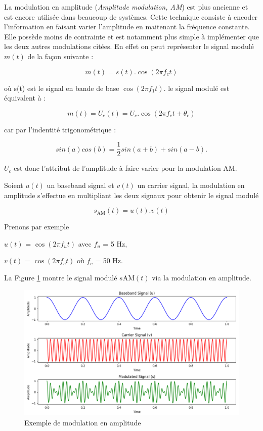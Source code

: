 La modulation en amplitude (\textit{Amplitude modulation, AM}) est plus ancienne et est encore utilisée dans beaucoup de systèmes. Cette technique consiste à encoder l'information en faisant varier l'amplitude en maitenant la fréquence constante. Elle possède moins de contrainte et est notamment plus simple à implémenter que les deux autres modulations citées. En effet on peut représenter le signal modulé $m(t)$ de la façon suivante :

\begin{equation}\label{eq112}
m(t) = s(t) . \cos(2 \pi f_c t)
\end{equation}

où s(t) est le signal en bande de base $\cos(2 \pi f_1 t)$. le signal modulé est équivalent à :

\begin{equation}\label{eq113}
m(t) = U_c(t) = U_c . \cos(2 \pi f_c t + \theta_c)
\end{equation}

car par l'indentité trigonométrique :

\begin{equation}\label{eq114}
sin(a)cos(b) = \frac{1}{2} sin(a+b) + sin(a-b).
\end{equation}

$U_c$ est donc l'attribut de l'amplitude à faire varier pour la modulation AM.

\vspace{0.1cm}

Soient $u(t)$ un baseband signal et $v(t)$ un carrier signal, la modulation en amplitude s'effectue en multipliant les deux signaux pour obtenir le signal modulé 

\begin{equation}\label{eq2}
s_\mathrm{AM}(t) = u(t) . v(t)
\end{equation}

Prenons par exemple 

$u(t)$ = $\cos(2\pi f_{u}t)$ avec $f_{u}$ = 5 Hz,

$v(t)$ = $\cos(2\pi f_{c}t)$ où $f_{c}$ = 50 Hz.

La Figure \ref{term1} montre le signal modulé $s\mathrm{AM}(t)$ via la modulation en amplitude.


\begin{figure}[h]
\centering

\includegraphics[scale=0.5]{images/AM_mod.PNG}
\caption{Exemple de modulation en amplitude}\label{term1}
\end{figure}

